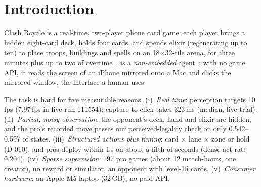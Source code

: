 \section{Introduction}
\label{sec:intro}

Clash Royale is a real-time, two-player phone card game: each player brings a hidden eight-card deck, holds four cards, and spends elixir (regenerating up to ten) to place troops, buildings and spells on an 18$\times$32-tile arena, for three minutes plus up to two of overtime~\cite{wu2025nonembedded}. %
\cb{} is a \emph{non-embedded} agent~\cite{wu2025nonembedded}: with no game API, it reads the screen of an iPhone mirrored onto a Mac and clicks the mirrored window, the interface a human uses.

The task is hard for five measurable reasons. (i)~\emph{Real time}: perception targets 10\,fps (7.97\,fps in live run 111554); capture to click takes 323\,ms (median, live trial). %
(ii)~\emph{Partial, noisy observation}: the opponent's deck, hand and elixir are hidden, and the pro's recorded move passes our perceived-legality check on only 0.542--0.597 of states. %
(iii)~\emph{Structured actions plus timing}: card $\times$ lane $\times$ zone or hold (D-010), and pros deploy within 1\,s on about a fifth of seconds (dense act rate 0.204). %
(iv)~\emph{Sparse supervision}: 197 pro games (about 12 match-hours, one creator), no reward or simulator, an opponent with level-15 cards. %
(v)~\emph{Consumer hardware}: an Apple M5 laptop (32\,GB), no paid API. %

